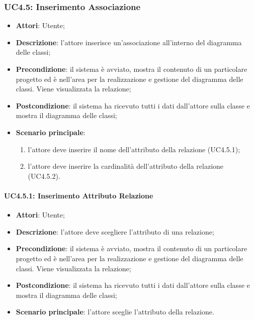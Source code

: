 \subsubsection{UC4.5: Inserimento Associazione}
\label{UC4.5}
\begin{itemize}
	\item \textbf{Attori}: Utente;
	\item \textbf{Descrizione}: l'attore inserisce un'associazione all'interno del diagramma delle classi;
	\item \textbf{Precondizione}: il sistema è avviato, mostra il contenuto di un particolare progetto ed è nell'area per la realizzazione e gestione del diagramma delle classi. Viene visualizzata la relazione;
	\item \textbf{Postcondizione}: il sistema ha ricevuto tutti i dati dall'attore sulla classe e mostra il diagramma delle classi;
	\item \textbf{Scenario principale}:
	\begin{enumerate}
		\item l'attore deve inserire il nome dell'attributo della relazione (UC4.5.1);
		\item l'attore deve inserire la cardinalità dell'attributo della relazione (UC4.5.2).
	\end{enumerate}
\end{itemize}

\paragraph{UC4.5.1: Inserimento Attributo Relazione}
\label{UC4.5.1}
\begin{itemize}
	\item \textbf{Attori}: Utente;
	\item \textbf{Descrizione}: l'attore deve scegliere l'attributo di una relazione;
	\item \textbf{Precondizione}: il sistema è avviato, mostra il contenuto di un particolare progetto ed è nell'area per la realizzazione e gestione del diagramma delle classi. Viene visualizzata la relazione;
	\item \textbf{Postcondizione}: il sistema ha ricevuto tutti i dati dall'attore sulla classe e mostra il diagramma delle classi;
	\item \textbf{Scenario principale}: l'attore sceglie l'attributo della relazione.
\end{itemize}

